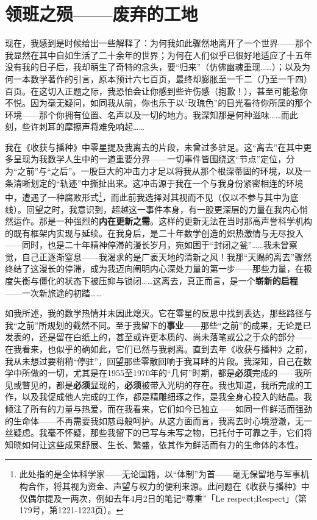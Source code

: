 \section{领班之殒——废弃的工地}

现在，我感到是时候给出一些解释了：为何我如此骤然地离开了一个世界——那个我显然在其中自如生活了二十余年的世界；为何在人们似乎已很好地适应了十五年没有我的日子后，我却萌生了奇特的念头，要``归来''（仿佛幽魂重现……）；以及为何一本数学著作的引言，原本预计六七百页，最终却膨胀至一千二（乃至一千四）百页。在这切入正题之际，我恐怕会让你感到些许伤感（抱歉！），甚至可能惹你不悦。因为毫无疑问，如同我从前，你也乐于以``玫瑰色''的目光看待你所属的那个环境——那个你拥有位置、名声以及一切的地方。我深知那是何种滋味……而此刻，些许刺耳的摩擦声将难免响起……

我在《收获与播种》中零星提及我离去的片段，未曾过多驻足。这``离去''在其中更多呈现为我数学人生中的一道重要分界——一切事件皆围绕这``节点''定位，分为``之前''与``之后''。一股巨大的冲击力才足以将我从那个根深蒂固的环境，以及一条清晰划定的``轨迹''中撕扯出来。这冲击源于我在一个与我身份紧密相连的环境中，遭遇了一种腐败形式\footnote{此处指的是全体科学家——无论国籍，以“体制”为首——毫无保留地与军事机构合作，将其视为资金、声望与权力的便利来源。此问题在《收获与播种》中仅偶尔提及一两次，例如去年4月2日的笔记“尊重”「Le respect;Respect」（第179号，第1221-1223页）。}，而此前我选择对其视而不见（仅以不参与其中为底线）。回望之时，我意识到，超越这一事件本身，有一股更深层的力量在我内心悄然运作。那是一种强烈的\textbf{内在更新之需}。这样的更新无法在当时那高声誉科学机构的既有框架内实现与延续。在我身后，是二十年数学创造的炽热激情与无尽投入——同时，也是二十年精神停滞的漫长岁月，宛如困于``封闭之瓮''……我未曾察觉，自己正逐渐窒息——我渴求的是广袤天地的清新之风！我那``天赐的离去''骤然终结了这漫长的停滞，成为我迈向阐明内心深处力量的第一步——那些力量，在极度失衡与僵化的状态下被压抑与锁闭……这离去，真正而言，是一个\textbf{崭新的启程}——一次新旅途的初踏……

如我所述，我的数学热情并未因此熄灭。它在零星的反思中找到表达，那些路径与我``之前''所规划的截然不同。至于我留下的\textbf{事业}——那些``之前''的成果，无论是已发表的，还是留在白纸上的，甚至或许更本质的、尚未落笔或公之于众的部分——在我看来，也似乎的确如此，它们已然与我剥离。直到去年《收获与播种》之前，我从未想过要稍稍``停驻''，回望那些零散回响于我耳畔的片段。我深知，自己在数学中所做的一切，尤其是在1955至1970年的``几何''时期，都是\textbf{必须}完成的——我所见或瞥见的，都是\textbf{必须}显现的，\textbf{必须}被带入光明的存在。我也知道，我所完成的工作，以及我促成他人完成的工作，都是精雕细琢之作，是我全身心投入的结晶。我倾注了所有的力量与热爱，而在我看来，它们如今已独立——如同一件鲜活而强劲的生命体——不再需要我如慈母般呵护。从这方面而言，我离去时心境澄澈，无一丝疑虑。我毫不怀疑，那些我留下的已写与未写之物，已托付于可靠之手，它们将知晓如何让这些成果舒展、生长、繁盛，依其作为鲜活而有力的生命体的本性。

